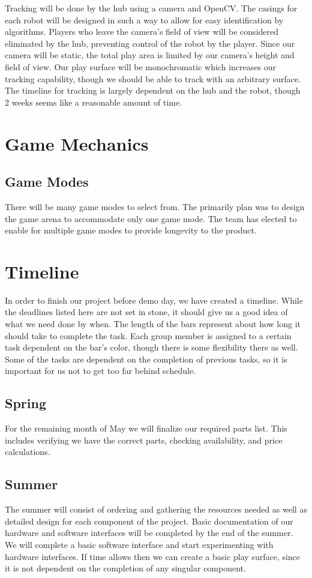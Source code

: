 \documentclass[11pt]{ieeeconf}
\begin{document}
Tracking will be done by the hub using a camera and OpenCV. The casings for each robot will be designed in such a way to allow for easy identification by algorithms. Players who leave the camera's field of view will be considered eliminated by the hub, preventing control of the robot by the player. Since our camera will be static, the total play area is limited by our camera's height and field of view. Our play surface will be monochromatic which increases our tracking capability, though we should be able to track with an arbitrary surface. The timeline for tracking is largely dependent on the hub and the robot, though 2 weeks seems like a reasonable amount of time.

\section{Game Mechanics}

\subsection{Game Modes}

There will be many game modes to select from. The primarily plan was to design the game arena to accommodate only one game mode. The team has elected to enable for multiple game modes to provide longevity to the product.    

\section{Timeline}
In order to finish our project before demo day, we have created a timeline. While the deadlines listed here are not set in stone, it should give us a good idea of what we need done by when. The length of the bars represent about how long it should take to complete the task. Each group member is assigned to a certain task dependent on the bar's color, though there is some flexibility there as well. Some of the tasks are dependent on the completion of previous tasks, so it is important for us not to get too far behind schedule. 

\subsection{Spring}
For the remaining month of May we will finalize our required parts list. This includes verifying we have the correct parts, checking availability, and price calculations.

\subsection{Summer}
The summer will consist of ordering and gathering the resources needed as well as detailed design for each component of the project. Basic documentation of our hardware and software interfaces will be completed by the end of the summer. We will complete a basic software interface and start experimenting with hardware interfaces. If time allows then we can create a basic play surface, since it is not dependent on the completion of any singular component.
\end{document}
